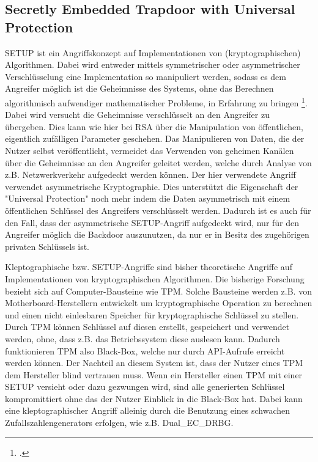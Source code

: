         \subsection{Secretly Embedded Trapdoor with Universal Protection}
        \ac{SETUP} ist ein Angriffskonzept auf Implementationen von (kryptographischen) Algorithmen. Dabei wird entweder mittels symmetrischer oder asymmetrischer Verschlüsselung eine Implementation so manipuliert werden, sodass es dem Angreifer möglich ist die Geheimnisse des Systems, ohne das Berechnen algorithmisch aufwendiger mathematischer Probleme, in Erfahrung zu bringen \footcite[1]{markelova.2020}. Dabei wird versucht die Geheimnisse verschlüsselt an den Angreifer zu übergeben. Dies kann wie hier bei \ac{RSA} über die Manipulation von öffentlichen, eigentlich zufälligen Parameter geschehen. Das Manipulieren von Daten, die der Nutzer selbst veröffentlicht, vermeidet das Verwenden von geheimen Kanälen über die Geheimnisse an den Angreifer geleitet werden, welche durch Analyse von z.B. Netzwerkverkehr aufgedeckt werden können. Der hier verwendete Angriff verwendet asymmetrische Kryptographie. Dies unterstützt die Eigenschaft der "Universal Protection" noch mehr indem die Daten asymmetrisch mit einem öffentlichen Schlüssel des Angreifers verschlüsselt werden. Dadurch ist es auch für den Fall, dass der asymmetrische \ac{SETUP}-Angriff aufgedeckt wird, nur für den Angreifer möglich die Backdoor auszunutzen, da nur er in Besitz des zugehörigen privaten Schlüssels ist.

        Kleptographische bzw. \ac{SETUP}-Angriffe sind bisher theoretische Angriffe auf Implementationen von kryptographischen Algorithmen. Die bisherige Forschung bezieht sich auf Computer-Bausteine wie \ac{TPM}. Solche Bausteine werden z.B. von Motherboard-Herstellern entwickelt um kryptographische Operation zu berechnen und einen nicht einlesbaren Speicher für kryptographische Schlüssel zu stellen. Durch \ac{TPM} können Schlüssel auf diesen erstellt, gespeichert und verwendet werden, ohne, dass z.B. das Betriebssystem diese auslesen kann. Dadurch funktionieren \ac{TPM} also Black-Box, welche nur durch API-Aufrufe erreicht werden können. Der Nachteil an diesem System ist, dass der Nutzer eines TPM dem Hersteller blind vertrauen muss. Wenn ein Hersteller einen \ac{TPM} mit einer \ac{SETUP} versieht oder dazu gezwungen wird, sind alle generierten Schlüssel kompromittiert ohne das der Nutzer Einblick in die Black-Box hat. Dabei kann eine kleptographischer Angriff alleinig durch die Benutzung eines schwachen Zufallszahlengenerators erfolgen, wie z.B. Dual\_EC\_DRBG. 

